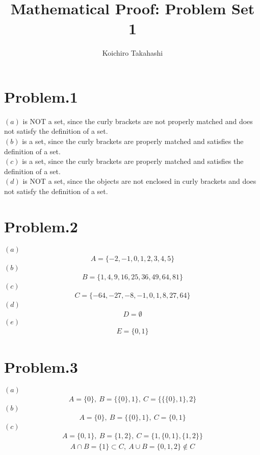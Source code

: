 \documentclass[12pt]{article}
\begin{document}
\title{Mathematical Proof: Problem Set 1}

\author{Koichiro Takahashi}

\maketitle 

\section*{Problem.1}
$(a)$ is NOT a set, since the curly brackets are not properly matched and does not satisfy the definition of a set.\\[1em]
$(b)$ is a set, since the curly brackets are properly matched and satisfies the definition of a set.\\[1em]
$(c)$ is a set, since the curly brackets are properly matched and satisfies the definition of a set.\\[1em]
$(d)$ is NOT a set, since the objects are not enclosed in curly brackets and does not satisfy the definition of a set.

\section*{Problem.2}
$(a)$
\begin{gather*}
A = \{-2, -1, 0, 1, 2, 3, 4, 5\}
\end{gather*}
$(b)$
\begin{gather*}
B = \{1, 4, 9, 16, 25, 36, 49, 64, 81\}
\end{gather*}
$(c)$
\begin{gather*}
C = \{-64, -27, -8, -1, 0, 1, 8, 27, 64\}
\end{gather*}
$(d)$
\begin{gather*}
D = \emptyset
\end{gather*}
$(e)$
\begin{gather*}
E = \{0,1\}
\end{gather*}

\section*{Problem.3}
$(a)$
\begin{gather*}
A = \{0\},~B = \{\{0\},1\},~C = \{\{\{0\},1\},2\}
\end{gather*}
$(b)$
\begin{gather*}
A = \{0\},~B = \{\{0\},1\},~C = \{0, 1\}
\end{gather*}
$(c)$
\begin{gather*}
A = \{0, 1\},~B = \{1, 2\},~C = \{1, \{0, 1\}, \{1, 2\}\}
\end{gather*}
\begin{gather*}
A \cap B = \{1\} \subset C,~A \cup B = \{0, 1, 2\} \notin C
\end{gather*}
\end{document}
